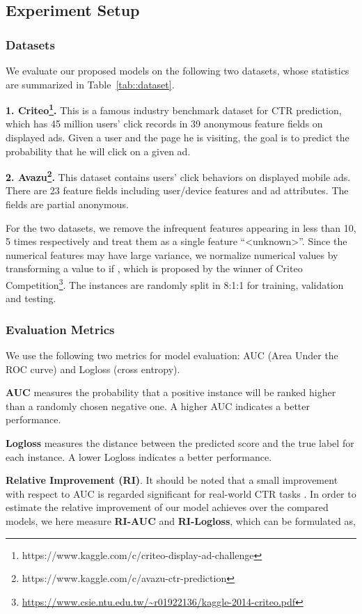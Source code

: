 \documentclass[sigconf]{acmart}
\begin{document}
\subsection{Experiment Setup}

\subsubsection{Datasets}
We evaluate our proposed models on the following two datasets, whose statistics are summarized in Table~\ref{tab::dataset}.

\textbf{1. Criteo\footnote{https://www.kaggle.com/c/criteo-display-ad-challenge}.} This is a famous industry benchmark dataset for CTR prediction, which has 45 million users' click records in 39 anonymous feature fields on displayed ads.
Given a user and the page he is visiting, the goal
is to predict the probability that he will click on a given ad.

\textbf{2. Avazu\footnote{https://www.kaggle.com/c/avazu-ctr-prediction}.} This dataset contains users' click behaviors on displayed mobile ads. 
There are 23 feature fields including user/device features and ad attributes.  
The fields are partial anonymous.

For the two datasets, we remove the infrequent features appearing in less than 10, 5 times respectively and treat them as a single feature ``<unknown>''.
Since the numerical features may have large variance, we normalize numerical values by transforming a value  to  if , which is proposed by the winner of Criteo Competition\footnote{\url{https://www.csie.ntu.edu.tw/~r01922136/kaggle-2014-criteo.pdf}}. 
The instances are randomly split in 8:1:1 for training, validation and testing. 


\subsubsection{Evaluation Metrics}
We use the following two metrics for model evaluation: AUC (Area Under the ROC curve) and Logloss (cross entropy).

\textbf{AUC} measures the probability that a positive instance will be ranked higher than a randomly chosen negative one.  
A higher AUC indicates a better performance.

\textbf{Logloss} measures the distance between the predicted score and the true label for each instance.
A lower Logloss indicates a better performance.

\textbf{Relative Improvement (RI)}. It should be noted that a small improvement with respect to AUC is regarded significant for real-world CTR tasks \cite{cheng2016wide,guo2017deepfm,wang2017deep,lian2018xdeepfm}. 
In order to estimate the relative improvement of our model achieves over the compared models, we here measure \textbf{RI-AUC} and \textbf{RI-Logloss}, which can be formulated as,
\end{document}
